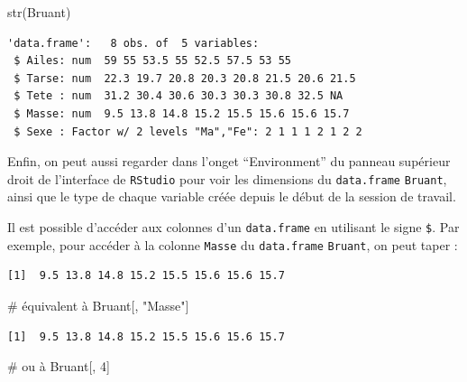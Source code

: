 \documentclass[
  a4paper,
  DIV=11,
  numbers=noendperiod,
  oneside]{scrreprt}
\newenvironment{Shaded}{}{}
\newcommand{\CommentTok}[1]{\textcolor[rgb]{0.42,0.45,0.49}{#1}}
\newcommand{\DecValTok}[1]{\textcolor[rgb]{0.00,0.36,0.77}{#1}}
\newcommand{\FunctionTok}[1]{\textcolor[rgb]{0.44,0.26,0.76}{#1}}
\newcommand{\NormalTok}[1]{\textcolor[rgb]{0.14,0.16,0.18}{#1}}
\newcommand{\SpecialCharTok}[1]{\textcolor[rgb]{0.00,0.36,0.77}{#1}}
\newcommand{\StringTok}[1]{\textcolor[rgb]{0.01,0.18,0.38}{#1}}
\begin{document}
\begin{Shaded}
\begin{Highlighting}[]
\FunctionTok{str}\NormalTok{(Bruant)}
\end{Highlighting}
\end{Shaded}

\begin{verbatim}
'data.frame':   8 obs. of  5 variables:
 $ Ailes: num  59 55 53.5 55 52.5 57.5 53 55
 $ Tarse: num  22.3 19.7 20.8 20.3 20.8 21.5 20.6 21.5
 $ Tete : num  31.2 30.4 30.6 30.3 30.3 30.8 32.5 NA
 $ Masse: num  9.5 13.8 14.8 15.2 15.5 15.6 15.6 15.7
 $ Sexe : Factor w/ 2 levels "Ma","Fe": 2 1 1 1 2 1 2 2
\end{verbatim}

Enfin, on peut aussi regarder dans l'onget ``Environment'' du panneau
supérieur droit de l'interface de \texttt{RStudio} pour voir les
dimensions du \texttt{data.frame} \texttt{Bruant}, ainsi que le type de
chaque variable créée depuis le début de la session de travail.

Il est possible d'accéder aux colonnes d'un \texttt{data.frame} en
utilisant le signe \texttt{\$}. Par exemple, pour accéder à la colonne
\texttt{Masse} du \texttt{data.frame} \texttt{Bruant}, on peut taper :

\begin{Shaded}
\end{Shaded}

\begin{verbatim}
[1]  9.5 13.8 14.8 15.2 15.5 15.6 15.6 15.7
\end{verbatim}

\begin{Shaded}
\begin{Highlighting}[]
\CommentTok{\# équivalent à }
\NormalTok{Bruant[, }\StringTok{"Masse"}\NormalTok{]}
\end{Highlighting}
\end{Shaded}

\begin{verbatim}
[1]  9.5 13.8 14.8 15.2 15.5 15.6 15.6 15.7
\end{verbatim}

\begin{Shaded}
\begin{Highlighting}[]
\CommentTok{\# ou à }
\NormalTok{Bruant[, }\DecValTok{4}\NormalTok{]}
\end{Highlighting}
\end{Shaded}
\end{document}
